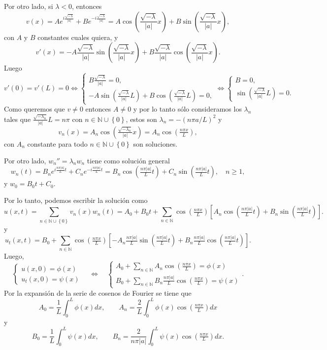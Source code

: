 \documentclass[12pt]{article}
\newcommand{\N}{\mathbb{N}}
\newcommand{\pp}[1]{\left( #1 \right)}
\newcommand{\cc}[1]{\left[ #1 \right]}
\newcommand{\set}[1]{\left\{#1\right\}}
\newcommand{\ssi}{\Longleftrightarrow}
\newcommand{\Ssi}{\quad\Longleftrightarrow\quad}
\renewcommand{\l}{\lambda}
\begin{document}
\begin{enumerate}
\begin{enumerate}
            Por otro lado, si $\l<0$, entonces
            \[ v(x) = Ae^{i\frac{\sqrt{-\l}}{|a|}} + Be^{-i\frac{\sqrt{-\l}}{|a|}} = A\cos\pp{\frac{\sqrt{-\l}}{|a|}x}+ B\sin\pp{\frac{\sqrt{-\l}}{|a|}x}, \]
            con $A$ y $B$ constantes cuales quiera, y
            \[ v'(x) =-A\frac{\sqrt{-\l}}{|a|}\sin\pp{\frac{\sqrt{-\l}}{|a|}x}+ B\frac{\sqrt{-\l}}{|a|}\cos\pp{\frac{\sqrt{-\l}}{|a|}x}. \]
            Luego
            \[ v'(0)=v'(L)=0\ssi \begin{cases}
                 B\tfrac{\sqrt{-\l}}{|a|}=0,\\
                -A\sin\pp{\tfrac{\sqrt{-\l}}{|a|}L}+ B\cos\pp{\tfrac{\sqrt{-\l}}{|a|}L}=0,
            \end{cases}\ssi\begin{cases}
                B=0,\\
                \sin\pp{\tfrac{\sqrt{-\l}}{|a|}L}=0.
            \end{cases} \]
            Como queremos que $v\neq 0$ entonces $A\neq 0$ y por lo tanto sólo consideramos los $\l_n$ tales que $\tfrac{\sqrt{-\l_n}}{|a|}L=n\pi$ con $n\in\N\cup\set{0}$, estos son $\l_n=-(n\pi a/L)^2$ y
            \[ v_n(x)= A_n\cos\pp{\tfrac{\sqrt{-\l_n}}{|a|}x}= A_n\cos\pp{\tfrac{n\pi x}{L}},\]
            con $A_n$ constante para todo $n\in\N\cup\set{0}$ son soluciones.

            
            Por otro lado, ${w_n}''=\l_nw_n$ tiene como solución general
            \[ w_n(t)=B_ne^{i\tfrac{n\pi |a|}{L}t}+ C_n e^{-i\tfrac{n\pi |a|}{L}t}= B_n\cos\pp{\tfrac{n\pi |a|}{L}t}+ C_n\sin\pp{\tfrac{n\pi |a|}{L}t},\quad n\geq 1, \]
            y $w_0=B_0t+C_0$.
    
            Por lo tanto, podemos escribir la solución como
            \[ u(x,t) = \sum_{n\in\N\cup\set{0}}v_n(x)w_n(t)=A_0+B_0t+\sum_{n\in\N}\cos\pp{\tfrac{n\pi x}{L}}\cc{A_n\cos\pp{\tfrac{n\pi |a|}{L}t}+ B_n\sin\pp{\tfrac{n\pi |a|}{L}t}}.\]
            y
            \[ u_t(x,t) = B_0+\sum_{n\in\N}\cos\pp{\tfrac{n\pi x}{L}}\cc{-A_n \tfrac{n\pi |a|}{L}\sin\pp{\tfrac{n\pi |a|}{L}t}+ B_n\tfrac{n\pi |a|}{L}\cos\pp{\tfrac{n\pi |a|}{L}t}}.\]
            Luego,
            \[ \begin{cases}
                    u(x,0)=\phi(x)\\
                    u_t(x,0)=\psi(x)
                \end{cases}
                \Ssi
                \begin{cases}
                    A_0+\sum_{n\in\N}A_n\cos\pp{\tfrac{n\pi x}{L}}=\phi(x)\\
                    B_0+\sum_{n\in\N}B_n\tfrac{n\pi |a|}{L}\cos\pp{\tfrac{n\pi x}{L}}=\psi(x)
                \end{cases}. \]
            Por la expansión de la serie de cosenos de Fourier se tiene que
            \[ A_0 = \frac{1}{L}\int_0^{L}\phi(x)dx,\qquad A_n = \frac{2}{L}\int_0^{L}\phi(x)\cos\pp{\tfrac{n\pi x}{L}}dx\]
            y
            \[B_0= \frac{1}{L}\int_0^{L}\psi(x)dx,\qquad B_n= \frac{2}{n\pi|a|}\int_0^{L}\psi(x)\cos\pp{\tfrac{n\pi x}{L}}dx.\]
    

\end{enumerate}
\end{enumerate}
\end{document}

